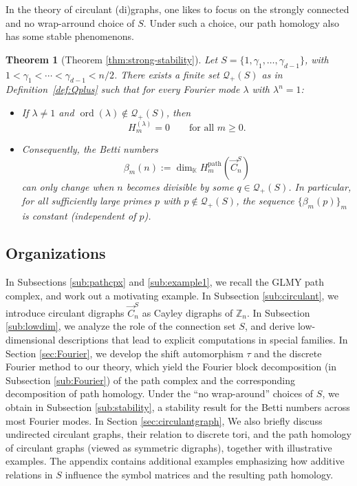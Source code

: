\documentclass[11pt]{amsart}
\newcommand{\Z}{\mathbb Z}
\newcommand{\K}{\mathbb K}
\theoremstyle{plain}
\newtheorem{theorem}{Theorem}[section]
\theoremstyle{definition}
\numberwithin{equation}{section}
\begin{document}
In the theory of circulant (di)graphs, one likes to focus on the strongly connected and no wrap-arround choice of $S$. Under such a choice, our path homology also has some stable phenomenons. 


\begin{theorem}[Theorem \ref{thm:strong-stability}]
Let $S=\{1,\gamma_1,\ldots,\gamma_{d-1}\}$, with $1<\gamma_1<\cdots<\gamma_{d-1}<n/2$. There exists a finite set $\mathcal Q_+(S)$ as in Definition~\ref{def:Qplus} such that for every Fourier mode $\lambda$ with $\lambda^n=1$:
\begin{itemize}
\item[(1)] If $\lambda\neq 1$ and $\operatorname{ord}(\lambda)\notin \mathcal Q_+(S)$, then
\[
H_m^{(\lambda)}=0\qquad\text{for all }m\ge 0.
\]
\item[(2)] Consequently, the Betti numbers
\[
\beta_m(n):=\dim_\K H_m^{\mathrm{path}}(\vec{C}_n^S)
\]
can only change when $n$ becomes divisible by some $q\in\mathcal Q_+(S)$.
In particular, for all sufficiently large primes $p$ with $p\notin \mathcal Q_+(S)$, the sequence $\{\beta_m(p)\}_m$ is
constant (independent of $p$).
\end{itemize}
\end{theorem}


\subsection{Organizations}

In Subsections \ref{sub:pathcpx} and \ref{sub:example1}, we recall the GLMY path complex, and work out a motivating example. In Subsection \ref{sub:circulant}, we
introduce circulant digraphs $\vec{C}_n^S$ as Cayley digraphs
of $\Z_n$. In Subsection \ref{sub:lowdim}, we analyze the role of the connection set $S$, and derive low-dimensional descriptions that lead to explicit computations in special families. In Section \ref{sec:Fourier}, we develop the shift automorphism $\tau$ and the discrete Fourier method to our theory, which yield the Fourier block decomposition (in Subsection \ref{sub:Fourier}) of the path complex and the corresponding decomposition of path homology. Under the “no wrap-around” choices of $S$, we obtain in Subsection \ref{sub:stability}, a stability result for the Betti numbers across most Fourier modes. In Section \ref{sec:circulantgraph}, We also briefly discuss undirected
circulant graphs, their relation to discrete tori, and the path homology of circulant graphs (viewed as
symmetric digraphs), together with illustrative examples. The appendix contains additional examples
emphasizing how additive relations in $S$ influence the symbol matrices and the resulting path homology.
\end{document}
